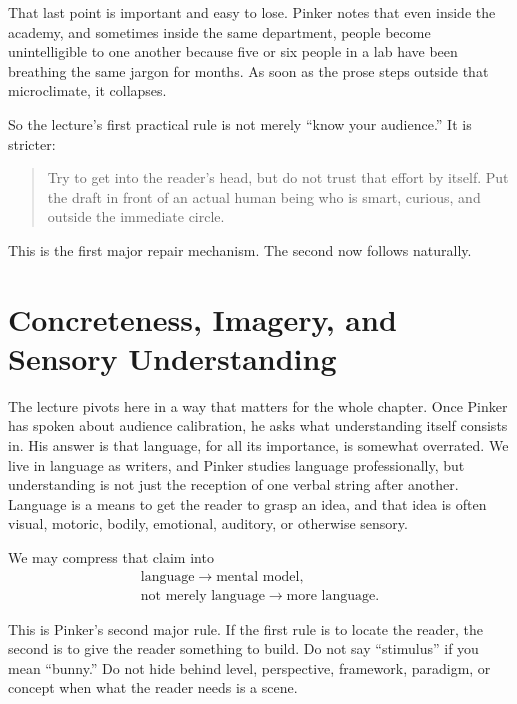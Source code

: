 That last point is important and easy to lose. Pinker notes that even inside the academy, and sometimes inside the same department, people become unintelligible to one another because five or six people in a lab have been breathing the same jargon for months. As soon as the prose steps outside that microclimate, it collapses.

So the lecture's first practical rule is not merely ``know your audience.'' It is stricter:
\begin{quote}
Try to get into the reader's head, but do not trust that effort by itself. Put the draft in front of an actual human being who is smart, curious, and outside the immediate circle.
\end{quote}

This is the first major repair mechanism. The second now follows naturally.

\section{Concreteness, Imagery, and Sensory Understanding}

The lecture pivots here in a way that matters for the whole chapter. Once Pinker has spoken about audience calibration, he asks what understanding itself consists in. His answer is that language, for all its importance, is somewhat overrated. We live in language as writers, and Pinker studies language professionally, but understanding is not just the reception of one verbal string after another. Language is a means to get the reader to grasp an idea, and that idea is often visual, motoric, bodily, emotional, auditory, or otherwise sensory.

We may compress that claim into
\begin{equation}
\begin{gathered}
\text{language} \to \text{mental model}, \\
\text{not merely language} \to \text{more language}.
\end{gathered}
\end{equation}

This is Pinker's second major rule. If the first rule is to locate the reader, the second is to give the reader something to build. Do not say ``stimulus'' if you mean ``bunny.'' Do not hide behind level, perspective, framework, paradigm, or concept when what the reader needs is a scene.

